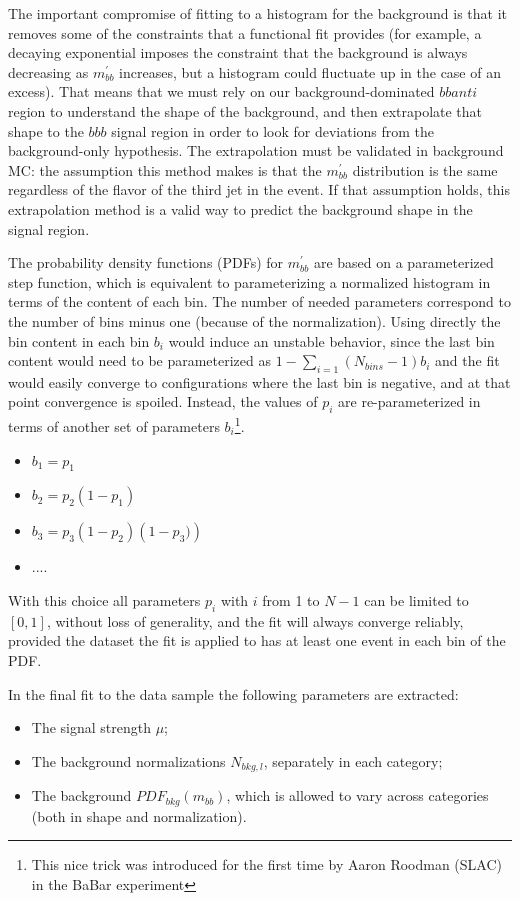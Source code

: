 The important compromise of fitting to a histogram for the
background is that it removes some of the constraints that a functional
fit provides (for example, a decaying exponential imposes the constraint
that the background is always decreasing as $m^{'}_{bb}$ increases, 
but a histogram could fluctuate up in the case of an excess).  That 
means that we must rely on our background-dominated $bbanti$ region
to understand the shape of the background, and then extrapolate that
shape to the $bbb$ signal region in order to look for deviations from
the background-only hypothesis.  The extrapolation must be validated in 
background MC: the assumption this method makes is that the $m^{'}_{bb}$
distribution is the same regardless of the flavor of the third jet 
in the event.  If that assumption holds, this extrapolation method is a
valid way to predict the background shape in the signal region.


The probability density functions (PDFs) for $m^{'}_{bb}$ are based on a parameterized step function,
which is equivalent to parameterizing a normalized histogram in terms of the content of each
bin. The number of needed parameters correspond to the number of bins minus one
(because of the normalization). Using directly the bin content in each bin
$b_{i}$ would induce an unstable behavior, since the last bin
content would need to be parameterized as $1-\sum_{i=1}{(N_{bins}-1)} b_{i}$
and the fit would easily converge to configurations where the last bin is negative,
and at that point convergence is spoiled. Instead, the values of $p_{i}$
are re-parameterized in terms of another set of parameters
$b_{i}$\footnote{This nice trick was introduced for the first time by Aaron Roodman (SLAC) in the BaBar experiment}.

\begin{itemize}
\item $b_{1} = p_{1}$
\item $b_{2} = p_{2} \left(1-p_{1}\right)$
\item $b_{3} = p_{3} \left(1-p_{2} \right) \left( 1-p_{3}) \right)$
\item $....$
\end{itemize}
With this choice all parameters $p_{i}$ with $i$ from 
1 to $N-1$ can be limited to $[0,1]$, without loss of generality, 
and the fit will always converge reliably, provided the dataset the fit is applied 
to has at least one event in each bin of the PDF.

In the final fit to the data sample the following parameters are extracted:
\begin{itemize}
\item The signal strength $\mu$;
\item The background normalizations $N_{bkg,l}$, separately in each category;
\item The  background $PDF_{bkg}(m_{bb})$, which is allowed to vary across categories (both in shape and normalization).
\end{itemize} 


